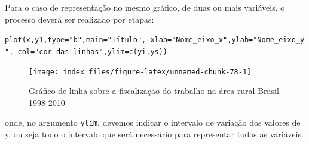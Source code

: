\documentclass[12pt,brazil,]{book}
\newenvironment{Shaded}{\begin{snugshade}}{\end{snugshade}}
\newcommand{\DataTypeTok}[1]{\textcolor[rgb]{0.13,0.29,0.53}{#1}}
\newcommand{\DecValTok}[1]{\textcolor[rgb]{0.00,0.00,0.81}{#1}}
\newcommand{\KeywordTok}[1]{\textcolor[rgb]{0.13,0.29,0.53}{\textbf{#1}}}
\newcommand{\NormalTok}[1]{#1}
\newcommand{\OperatorTok}[1]{\textcolor[rgb]{0.81,0.36,0.00}{\textbf{#1}}}
\newcommand{\StringTok}[1]{\textcolor[rgb]{0.31,0.60,0.02}{#1}}
\begin{document}
Para o caso de representação no mesmo gráfico, de duas ou mais
variáveis, o processo deverá ser realizado por etapas:

\texttt{plot(x,y1,type="b",main="Título",\ xlab="Nome\_eixo\_x",ylab="Nome\_eixo\_y",\ col="cor\ das\ linhas",ylim=c(yi,ys))}

\begin{Shaded}
\end{Shaded}

\begin{figure}

{\centering \texttt{[image: index\_files/figure-latex/unnamed-chunk-78-1]} 

}

\caption{Gráfico de linha sobre a fiscalização do trabalho na área rural Brasil 1998-2010}\label{fig:unnamed-chunk-78}
\end{figure}

onde, no argumento \texttt{ylim}, devemos indicar o intervalo de
variação dos valores de y, ou seja todo o intervalo que será necessário
para representar todas as variáveis.
\end{document}
